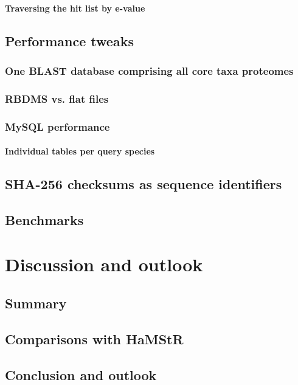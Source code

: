 \documentclass[a4paper,12pt]{scrreprt}
\newcommand{\hamstr}{HaMStR\xspace}
\begin{document}
		\subsubsection{Traversing the hit list by e-value}
		
	\section{Performance tweaks}
		\subsection{One BLAST database comprising all core taxa proteomes}
			
		\subsection{RBDMS vs. flat files}
		\subsection{MySQL performance}
		\subsubsection{Individual tables per query species}
			
	\section{SHA-256 checksums as sequence identifiers}
		
	\section{Benchmarks}

\chapter{Discussion and outlook}
	
	\section{Summary}
	\section{Comparisons with \hamstr}
	\section{Conclusion and outlook}
\end{document}
